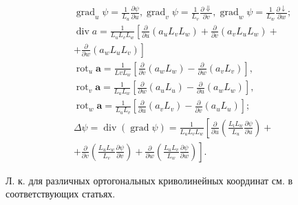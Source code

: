 \documentclass[10pt]{article}
\begin{document}
\[

\begin{aligned}

& \operatorname{grad}_{u} \psi=\frac{1}{L_{u}} \frac{\partial \psi}{\partial u}, \operatorname{grad}_{v} \psi=\frac{1}{L_{v}} \frac{\partial \Downarrow}{\partial v}, \operatorname{grad}_{w} \psi=\frac{1}{L_{w}} \frac{\partial \downarrow}{\partial w} ; \\

& \operatorname{div} a=\frac{1}{L_{u} L_{v} L_{w}}\left[\frac{\partial}{\partial u}\left(a_{u} L_{v} L_{w}\right)+\frac{\partial}{\partial v}\left(a_{v} L_{u} L_{w}\right)+\right. \\

& \left.+\frac{\partial}{\partial w}\left(a_{w} L_{u} L_{v}\right)\right] \\

& \operatorname{rot}_{u} \boldsymbol{a}=\frac{1}{L v L_{w}}\left[\frac{\partial}{\partial v}\left(a_{w} L_{w}\right)-\frac{\partial}{\partial w}\left(a_{v} L_{v}\right)\right] \text {, } \\

& \operatorname{rot}_{v} \boldsymbol{a}=\frac{1}{L_{u} L_{w}}\left[\frac{\partial}{\partial w}\left(a_{u} L_{u}\right)-\frac{\partial}{\partial u}\left(a_{w} L_{w}\right)\right] \text {, } \\

& \operatorname{rot}_{w} \boldsymbol{a}=\frac{1}{L_{u} L_{v}}\left[\frac{\partial}{\partial u}\left(a_{v} L_{v}\right)-\frac{\partial}{\partial v}\left(a_{u} L_{u}\right)\right] \text {; } \\

& \Delta \psi=\operatorname{div}(\operatorname{grad} \psi)=\frac{1}{L_{u} L_{v} L_{w}}\left[\frac{\partial}{\partial u}\left(\frac{L_{\imath} L_{w}}{L_{u}} \frac{\partial \psi}{\partial u}\right)+\right. \\

& \left.+\frac{\partial}{\partial v}\left(\frac{L_{u} L_{w}}{L_{v}} \frac{\partial \psi}{\partial v}\right)+\frac{\partial}{\partial w}\left(\frac{L_{u} L_{v}}{L_{w}} \frac{\partial \psi}{\partial w}\right)\right] \text {. }

\end{aligned}

\]



Л. к. для различных ортогональных криволинейных координат см. в соответствующих статьях.
\end{document}
